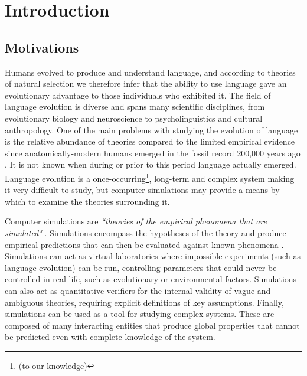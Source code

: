 \documentclass[12pt,a4paper,twoside,openright]{report}
\begin{document}

\pagestyle{headings}

\chapter{Introduction}
\setcounter{page}{1}

\section{Motivations}

Humans evolved to produce and understand language, and according to theories of natural selection we therefore infer that the ability to use language gave an evolutionary advantage to those individuals who exhibited it. The field of language evolution is diverse and spans many scientific disciplines, from evolutionary biology and neuroscience to psycholinguistics and cultural anthropology. One of the main problems with studying the evolution of language is the relative abundance of theories compared to the limited empirical evidence since anatomically-modern humans emerged in the fossil record 200,000 years ago \citep{Fleagle2008}. It is not known when during or prior to this period language actually emerged. Language evolution is a once-occurring\footnote{(to our knowledge)}, long-term and complex system making it very difficult to study, but computer simulations may provide a means by which to examine the theories surrounding it.

Computer simulations are \emph{``theories of the empirical phenomena that are simulated"} \citep{cangelosi2012simulating}. Simulations encompass the hypotheses of the theory and produce empirical predictions that can then be evaluated against known phenomena \citep{cavalli1997genes}. Simulations can act as virtual laboratories where impossible experiments (such as language evolution) can be run, controlling parameters that could never be controlled in real life, such as evolutionary or environmental factors. Simulations can also act as quantitative verifiers for the internal validity of vague and ambiguous theories, requiring explicit definitions of key assumptions. Finally, simulations can be used as a tool for studying complex systems. These are composed of many interacting entities that produce global properties that cannot be predicted even with complete knowledge of the system.
\end{document}
